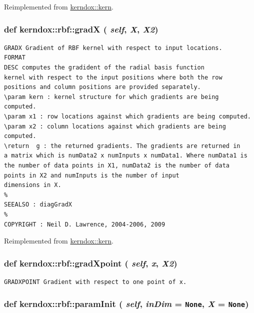 Reimplemented from \hyperlink{classkerndox_1_1kern}{kerndox::kern}.\hypertarget{classkerndox_1_1rbf_d7293550322f0cb3a5b97f2dea290318}{
\subsubsection[{gradX}]{\setlength{\rightskip}{0pt plus 5cm}def kerndox::rbf::gradX ( {\em self}, \/   {\em X}, \/   {\em X2})}}
\label{classkerndox_1_1rbf_d7293550322f0cb3a5b97f2dea290318}




\footnotesize\begin{verbatim}GRADX Gradient of RBF kernel with respect to input locations.
FORMAT
DESC computes the gradident of the radial basis function
kernel with respect to the input positions where both the row
positions and column positions are provided separately.
\param kern : kernel structure for which gradients are being
computed.
\param x1 : row locations against which gradients are being computed.
\param x2 : column locations against which gradients are being computed.
\return  g : the returned gradients. The gradients are returned in
a matrix which is numData2 x numInputs x numData1. Where numData1 is
the number of data points in X1, numData2 is the number of data
points in X2 and numInputs is the number of input
dimensions in X.
%
SEEALSO : diagGradX
%
COPYRIGHT : Neil D. Lawrence, 2004-2006, 2009

\end{verbatim}
\normalsize
 

Reimplemented from \hyperlink{classkerndox_1_1kern}{kerndox::kern}.\hypertarget{classkerndox_1_1rbf_955b1766431cae06569e98329afb77bc}{
\subsubsection[{gradXpoint}]{\setlength{\rightskip}{0pt plus 5cm}def kerndox::rbf::gradXpoint ( {\em self}, \/   {\em x}, \/   {\em X2})}}
\label{classkerndox_1_1rbf_955b1766431cae06569e98329afb77bc}




\footnotesize\begin{verbatim}GRADXPOINT Gradient with respect to one point of x.\end{verbatim}
\normalsize
 \hypertarget{classkerndox_1_1rbf_f1bacaa66cb4060943170900db397ea6}{
\subsubsection[{paramInit}]{\setlength{\rightskip}{0pt plus 5cm}def kerndox::rbf::paramInit ( {\em self}, \/   {\em inDim} = {\tt None}, \/   {\em X} = {\tt None})}}
\label{classkerndox_1_1rbf_f1bacaa66cb4060943170900db397ea6}




